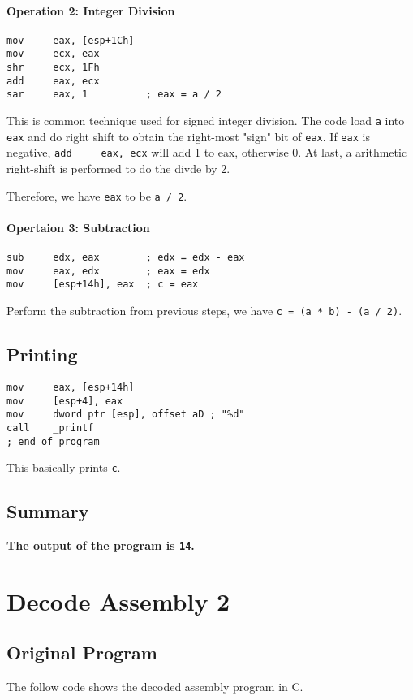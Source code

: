 \documentclass[11pt]{article}
\begin{document}
\paragraph{Operation 2: Integer Division}
\begin{lstlisting}[language={[x86masm]Assembler}]
mov     eax, [esp+1Ch]
mov     ecx, eax
shr     ecx, 1Fh
add     eax, ecx
sar     eax, 1          ; eax = a / 2
\end{lstlisting}
This is common technique used for signed integer division. The code load \lstinline{a} into \lstinline{eax} and do right shift to obtain the right-most "sign" bit of \lstinline{eax}. If \lstinline{eax} is negative, \lstinline{add     eax, ecx} will add 1 to eax, otherwise 0. At last, a arithmetic right-shift is performed to do the divde by 2. \par

Therefore, we have \lstinline{eax} to be \lstinline{a / 2}.
\paragraph{Opertaion 3: Subtraction}
\begin{lstlisting}[language={[x86masm]Assembler}]
sub     edx, eax        ; edx = edx - eax
mov     eax, edx        ; eax = edx
mov     [esp+14h], eax  ; c = eax
\end{lstlisting}
Perform the subtraction from previous steps, we have \lstinline{c = (a * b) - (a / 2)}.

\subsection{Printing}
\begin{lstlisting}[language={[x86masm]Assembler}]
mov     eax, [esp+14h]
mov     [esp+4], eax
mov     dword ptr [esp], offset aD ; "%d"
call    _printf
; end of program
\end{lstlisting}
This basically prints \lstinline{c}.

\subsection{Summary}

\textbf{The output of the program is \lstinline{14}.}

\section{Decode Assembly 2}
\subsection{Original Program}
The follow code shows the decoded assembly program in C.
\end{document}
